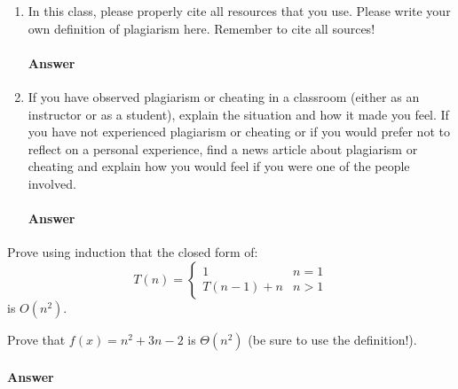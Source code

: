 \documentclass{article}
\begin{document}
\collab{\todo{}}

\begin{enumerate}

    \item In this class, please properly cite all resources that you use. Please
        write your own definition of plagiarism here.  Remember to cite all
        sources!

        \paragraph{Answer}
        \todo{}

    \item If you have observed plagiarism or cheating in a classroom (either as
        an instructor or as a student), explain the situation and how it made
        you feel.  If you have not experienced plagiarism or cheating or if you
        would prefer not to reflect on a personal experience, find a news
        article about plagiarism or cheating and explain how you would feel if
        you were one of the people involved.

        \paragraph{Answer}
        \todo{}
\end{enumerate}

\nextprob{}
Prove using induction that the closed form of:
$$T(n) = \begin{cases}
            1        & n=1\\
            T(n-1)+n & n>1
         \end{cases}
$$
is $O(n^2)$.


\collab{\todo{}}
Prove that $f(x)=n^2 + 3n -2$ is
$\Theta(n^2)$ (be sure to use the definition!).

\paragraph{Answer}

\todo{}
\end{document}
